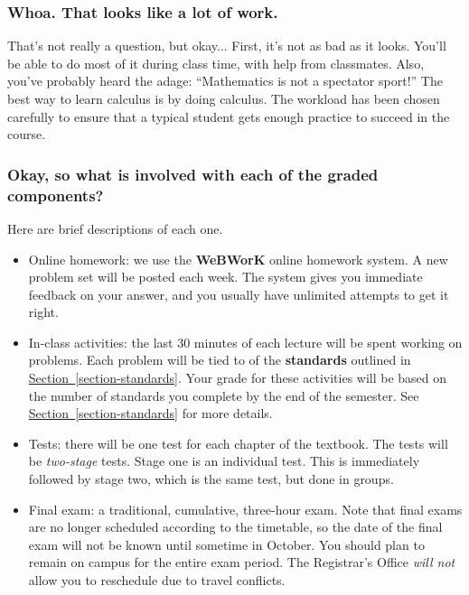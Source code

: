 \documentclass[10pt,]{article}
\newcommand{\terminology}[1]{\textbf{#1}}
\begin{document}
\subsubsection[{Whoa. That looks like a lot of work.}]{Whoa. That looks like a lot of work.}\label{subsubsection-13}
\hypertarget{p-20}{}%
That's not really a question, but okay... First, it's not as bad as it looks. You'll be able to do most of it during class time, with help from classmates. Also, you've probably heard the adage: ``Mathematics is not a spectator sport!'' The best way to learn calculus is by doing calculus. The workload has been chosen carefully to ensure that a typical student gets enough practice to succeed in the course.%
%
%
\typeout{************************************************}
\typeout{************************************************}
%
\subsubsection[{Okay, so what is involved with each of the graded components?}]{Okay, so what is involved with each of the graded components?}\label{subsubsection-14}
\hypertarget{p-21}{}%
Here are brief descriptions of each one.%
\leavevmode%
\begin{itemize}[label=\textbullet]
\item{}Online homework: we use the \terminology{WeBWorK} online homework system. A new problem set will be posted each week. The system gives you immediate feedback on your answer, and you usually have unlimited attempts to get it right.%
\item{}In-class activities: the last 30 minutes of each lecture will be spent working on problems. Each problem will be tied to of the \terminology{standards} outlined in \hyperref[section-standards]{Section~\ref{section-standards}}. Your grade for these activities will be based on the number of standards you complete by the end of the semester. See \hyperref[section-standards]{Section~\ref{section-standards}} for more details.%
\item{}Tests: there will be one test for each chapter of the textbook. The tests will be \emph{two-stage} tests. Stage one is an individual test. This is immediately followed by stage two, which is the same test, but done in groups.%
\item{}Final exam: a traditional, cumulative, three-hour exam. Note that final exams are no longer scheduled according to the timetable, so the date of the final exam will not be known until sometime in October. You should plan to remain on campus for the entire exam period. The Registrar's Office \emph{will not} allow you to reschedule due to travel conflicts.%
\end{itemize}
%
%
\typeout{************************************************}
\typeout{************************************************}
%
\end{document}
